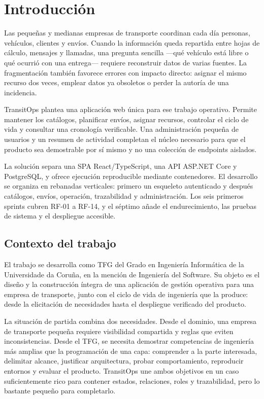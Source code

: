 \chapter{Introducción}

Las pequeñas y medianas empresas de transporte coordinan cada día personas, vehículos, clientes y envíos. Cuando la información queda repartida entre hojas de cálculo, mensajes y llamadas, una pregunta sencilla ---qué vehículo está libre o qué ocurrió con una entrega--- requiere reconstruir datos de varias fuentes. La fragmentación también favorece errores con impacto directo: asignar el mismo recurso dos veces, emplear datos ya obsoletos o perder la autoría de una incidencia.

TransitOps plantea una aplicación web única para ese trabajo operativo. Permite mantener los catálogos, planificar envíos, asignar recursos, controlar el ciclo de vida y consultar una cronología verificable. Una administración pequeña de usuarios y un resumen de actividad completan el núcleo necesario para que el producto sea demostrable por sí mismo y no una colección de endpoints aislados.

La solución separa una SPA React/TypeScript, una API ASP.NET Core y PostgreSQL, y ofrece ejecución reproducible mediante contenedores. El desarrollo se organiza en rebanadas verticales: primero un esqueleto autenticado y después catálogos, envíos, operación, trazabilidad y administración. Los seis primeros sprints cubren RF-01 a RF-14, y el séptimo añade el endurecimiento, las pruebas de sistema y el despliegue accesible.

\section{Contexto del trabajo}

El trabajo se desarrolla como TFG del Grado en Ingeniería Informática de la Universidade da Coruña, en la mención de Ingeniería del Software. Su objeto es el diseño y la construcción íntegra de una aplicación de gestión operativa para una empresa de transporte, junto con el ciclo de vida de ingeniería que la produce: desde la elicitación de necesidades hasta el despliegue verificado del producto.

La situación de partida combina dos necesidades. Desde el dominio, una empresa de transporte pequeña requiere visibilidad compartida y reglas que eviten inconsistencias. Desde el TFG, se necesita demostrar competencias de ingeniería más amplias que la programación de una capa: comprender a la parte interesada, delimitar alcance, justificar arquitectura, probar comportamiento, reproducir entornos y evaluar el producto. TransitOps une ambos objetivos en un caso suficientemente rico para contener estados, relaciones, roles y trazabilidad, pero lo bastante pequeño para completarlo.

